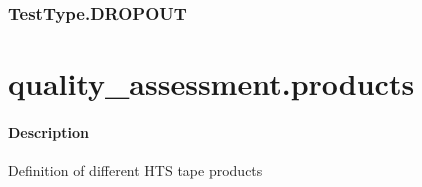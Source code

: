\documentclass[letterpaper,10pt,english]{sphinxmanual}
\begin{document}
\begin{fulllineitems}
\begin{fulllineitems}
\label{\detokenize{generated/quality_assessment.data_types.TestType.MINIMUM:quality_assessment.data_types.TestType.MINIMUM}}
\end{fulllineitems}



\subsection{TestType.DROPOUT}
\label{\detokenize{generated/quality_assessment.data_types.TestType.DROPOUT:testtype-dropout}}\label{\detokenize{generated/quality_assessment.data_types.TestType.DROPOUT::doc}}

\begin{fulllineitems}
\label{\detokenize{generated/quality_assessment.data_types.TestType.DROPOUT:quality_assessment.data_types.TestType.DROPOUT}}
\end{fulllineitems}


\end{fulllineitems}



\chapter{quality\_assessment.products}
\label{\detokenize{generated/quality_assessment.products:quality-assessment-products}}\label{\detokenize{generated/quality_assessment.products::doc}}\subsubsection*{Description}
\label{\detokenize{generated/quality_assessment.products:module-quality_assessment.products}}
\sphinxAtStartPar
Definition of different HTS tape products
\end{document}
